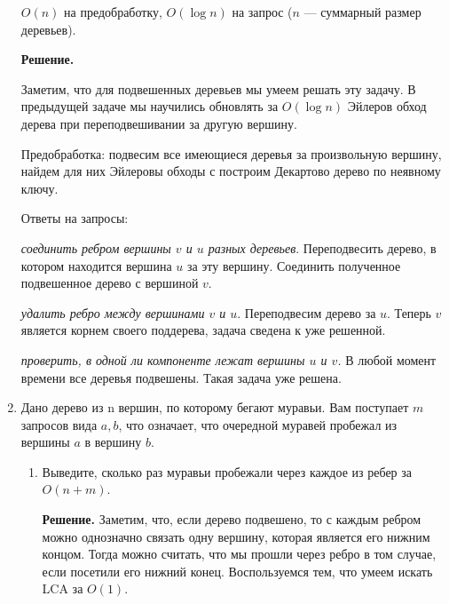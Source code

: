 \begin{enumerate}
	$O(n)$ на предобработку, $O(\log n)$ на запрос ($n$ — суммарный размер деревьев).
	
	\textbf{Решение.} 
	
	Заметим, что для подвешенных деревьев мы умеем решать эту задачу. В предыдущей задаче мы 
	научились обновлять за $O(\log n)$ Эйлеров обход дерева при переподвешивании за другую 
	вершину.
	
	Предобработка: подвесим все имеющиеся деревья за произвольную вершину, найдем для них 
	Эйлеровы обходы  с построим Декартово дерево по неявному ключу. 
	
	Ответы на запросы:
	
	\textit{соединить ребром вершины $v$ и $u$ разных деревьев}. Переподвесить дерево, в 
	котором находится вершина $u$ за эту вершину. Соединить полученное подвешенное дерево с 
	вершиной $v$.
	
	\textit{удалить ребро между вершинами $v$ и $u$}. Переподвесим дерево за $u$. Теперь $v$ 
	является корнем своего поддерева, задача сведена к уже решенной.
	
	\textit{проверить, в одной ли компоненте лежат вершины $u$ и $v$.} В любой момент времени 
	все деревья подвешены. Такая задача уже решена.
	
	
	
	\item Дано дерево из n вершин, по которому бегают муравьи. Вам поступает $m$
	запросов вида $a, b$, что означает, что очередной муравей пробежал из вершины $a$ в вершину 
	$b$.
	
	\begin{enumerate}
		\item Выведите, сколько раз муравьи пробежали через каждое из ребер за $O(n + m)$.
		
		\textbf{Решение. } Заметим, что, если дерево подвешено, то с каждым ребром можно 
		однозначно связать одну вершину, которая является его нижним концом. Тогда можно 
		считать, что мы прошли через ребро в том случае, если посетили его нижний конец. 
		Воспользуемся тем, что умеем искать LCA за $O(1)$. 
		

\end{enumerate}
\end{enumerate}
